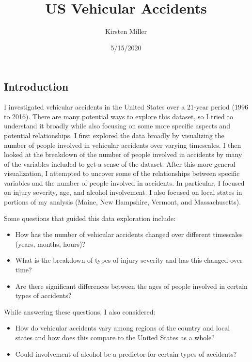 \documentclass[]{article}
\title{US Vehicular Accidents}
\author{Kirsten Miller}
\date{5/15/2020}
\providecommand{\tightlist}{%
  \setlength{\itemsep}{0pt}\setlength{\parskip}{0pt}}
\begin{document}
\maketitle

{
\setcounter{tocdepth}{2}
\tableofcontents
}
\hypertarget{introduction}{%
\subsection{Introduction}\label{introduction}}

I investigated vehicular accidents in the United States over a 21-year
period (1996 to 2016). There are many potential ways to explore this
dataset, so I tried to understand it broadly while also focusing on some
more specific aspects and potential relationships. I first explored the
data broadly by visualizing the number of people involved in vehicular
accidents over varying timescales. I then looked at the breakdown of the
number of people involved in accidents by many of the variables included
to get a sense of the dataset. After this more general visualization, I
attempted to uncover some of the relationships between specific
variables and the number of people involved in accidents. In particular,
I focused on injury severity, age, and alcohol involvement. I also
focused on local states in portions of my analysis (Maine, New
Hampshire, Vermont, and Massachusetts).

Some questions that guided this data exploration include:

\begin{itemize}
\tightlist
\item
  How has the number of vehicular accidents changed over different
  timescales (years, months, hours)?
\item
  What is the breakdown of types of injury severity and has this changed
  over time?
\item
  Are there significant differences between the ages of people involved
  in certain types of accidents?
\end{itemize}

While answering these questions, I also considered:

\begin{itemize}
\tightlist
\item
  How do vehicular accidents vary among regions of the country and local
  states and how does this compare to the United States as a whole?
\item
  Could involvement of alcohol be a predictor for certain types of
  accidents?
\end{itemize}
\end{document}
